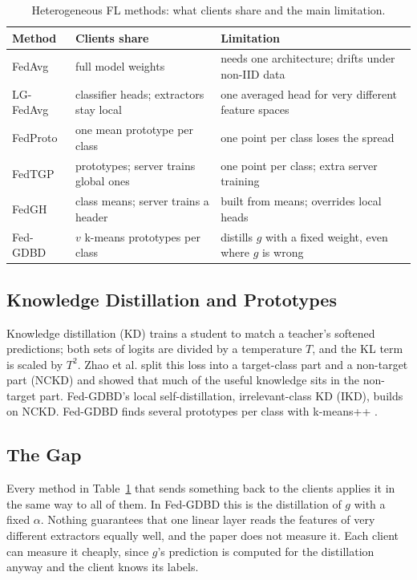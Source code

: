 \documentclass[conference]{IEEEtran}
\begin{document}
\begin{table}[t]
\centering
\caption{Heterogeneous FL methods: what clients share and the main limitation.}
\label{tab:lit}
\footnotesize
\begin{tabularx}{\columnwidth}{>{\raggedright\arraybackslash}p{1.45cm}>{\raggedright\arraybackslash}p{2.6cm}>{\raggedright\arraybackslash}X}
\toprule
Method & Clients share & Limitation \\
\midrule
FedAvg \cite{mcmahan2017fedavg} & full model weights & needs one architecture; drifts under non-IID data \\
LG-FedAvg \cite{liang2020lgfedavg} & classifier heads; extractors stay local & one averaged head for very different feature spaces \\
FedProto \cite{tan2022fedproto} & one mean prototype per class & one point per class loses the spread \\
FedTGP \cite{zhang2024fedtgp} & prototypes; server trains global ones & one point per class; extra server training \\
FedGH \cite{yi2023fedgh} & class means; server trains a header & built from means; overrides local heads \\
Fed-GDBD \cite{zhang2025gdbd} & $v$ k-means prototypes per class & distills $g$ with a fixed weight, even where $g$ is wrong \\
\bottomrule
\end{tabularx}
\end{table}

\subsection{Knowledge Distillation and Prototypes}
Knowledge distillation (KD) \cite{hinton2015kd} trains a student to match a teacher's softened predictions; both sets of logits are divided by a temperature $T$, and the KL term is scaled by $T^2$. Zhao et al. \cite{zhao2022dkd} split this loss into a target-class part and a non-target part (NCKD) and showed that much of the useful knowledge sits in the non-target part. Fed-GDBD's local self-distillation, irrelevant-class KD (IKD), builds on NCKD. Fed-GDBD finds several prototypes per class with k-means++ \cite{arthur2007kmeanspp}.

\subsection{The Gap}
Every method in Table~\ref{tab:lit} that sends something back to the clients applies it in the same way to all of them. In Fed-GDBD this is the distillation of $g$ with a fixed $\alpha$. Nothing guarantees that one linear layer reads the features of very different extractors equally well, and the paper does not measure it. Each client can measure it cheaply, since $g$'s prediction is computed for the distillation anyway and the client knows its labels.
\end{document}
